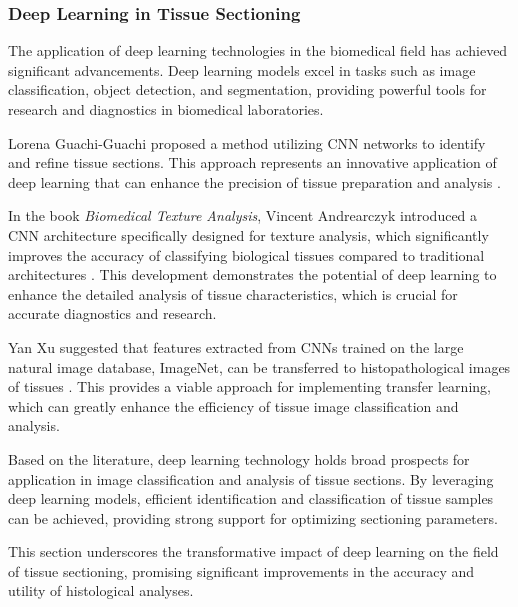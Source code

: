 \subsubsection{Deep Learning in Tissue Sectioning}

The application of deep learning technologies in the biomedical field has achieved significant advancements. Deep learning models excel in tasks such as image classification, object detection, and segmentation, providing powerful tools for research and diagnostics in biomedical laboratories.

Lorena Guachi-Guachi proposed a method utilizing CNN networks to identify and refine tissue sections. This approach represents an innovative application of deep learning that can enhance the precision of tissue preparation and analysis \cite{LR.7}.

In the book \textit{Biomedical Texture Analysis}, Vincent Andrearczyk introduced a CNN architecture specifically designed for texture analysis, which significantly improves the accuracy of classifying biological tissues compared to traditional architectures \cite{LR.8}. This development demonstrates the potential of deep learning to enhance the detailed analysis of tissue characteristics, which is crucial for accurate diagnostics and research.

Yan Xu suggested that features extracted from CNNs trained on the large natural image database, ImageNet, can be transferred to histopathological images of tissues \cite{LR.9}. This provides a viable approach for implementing transfer learning, which can greatly enhance the efficiency of tissue image classification and analysis.

Based on the literature, deep learning technology holds broad prospects for application in image classification and analysis of tissue sections. By leveraging deep learning models, efficient identification and classification of tissue samples can be achieved, providing strong support for optimizing sectioning parameters.

This section underscores the transformative impact of deep learning on the field of tissue sectioning, promising significant improvements in the accuracy and utility of histological analyses.



